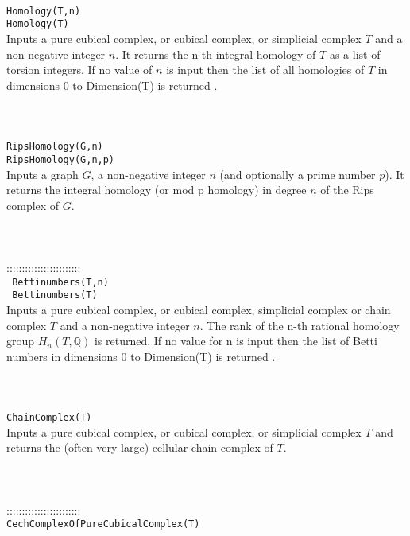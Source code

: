 \documentclass[a4paper,11pt]{report}
\begin{document}
{
 \\
 \\
 \\
 \texttt{Homology(T,n)}\\
 \texttt{Homology(T)}\\
 

 Inputs a pure cubical complex, or cubical complex, or simplicial complex $T$ and a non-negative integer $n$. It returns the n-th integral homology of $T$ as a list of torsion integers. If no value of $n$ is input then the list of all homologies of $T$ in dimensions 0 to Dimension(T) is returned . \\
 \\
 \\
 \\
 \texttt{RipsHomology(G,n)}\\
 \texttt{RipsHomology(G,n,p)}\\
 

 Inputs a graph $G$, a non-negative integer $n$ (and optionally a prime number $p$). It returns the integral homology (or mod p homology) in degree $n$ of the Rips complex of $G$. \\
 \\
 \\
 \\
 ::::::::::::::::::::::::\\
 \texttt{ Bettinumbers(T,n)}\\
 \texttt{ Bettinumbers(T)}\\
 

 Inputs a pure cubical complex, or cubical complex, simplicial complex or chain
complex $T$ and a non-negative integer $n$. The rank of the n-th rational homology group $H_n(T,\mathbb Q)$ is returned. If no value for n is input then the list of Betti numbers in
dimensions 0 to Dimension(T) is returned . \\
 \\
 \\
 \\
 \texttt{ChainComplex(T)}\\
 

 Inputs a pure cubical complex, or cubical complex, or simplicial complex $T$ and returns the (often very large) cellular chain complex of $T$. \\
 \\
 \\
 \\
 ::::::::::::::::::::::::\\
 \texttt{CechComplexOfPureCubicalComplex(T)}\\
 

}
\end{document}
